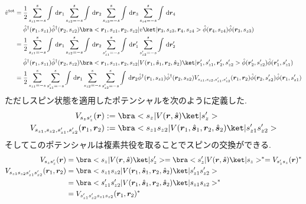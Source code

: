 \documentclass[uplatex,dvipdfmx,a4paper,11pt]{jlreq}
\newcommand{\rr}{\bm{r}}
\renewcommand{\ss}{\bm{s}}
\numberwithin{equation}{section}
\theoremstyle{definition}
\begin{document}
\begin{example}[Q21-87, Q21-88, Q21-89(i)(ii), Q21-90, Q21-91(i)(ii)(iii)(iv), Q21-92]
\begin{align}
    \hat{v}^{\mathrm{tot}} & = \frac{1}{2}\sum_{s_{z1} = -s}^s\int\dl{\rr_1}\sum_{s_{z2} = -s}^s\int\dl{\rr_2}\sum_{s_{z3} = -s}^s\int\dl{\rr_3}\sum_{s_{z4} = -s}^s\int\dl{\rr_4}                                                                                                                                               \\
                           & \quad\ \hat{\phi}^\dagger(\rr_1, s_{z1})\hat{\phi}^\dagger(\rr_2, s_{z2})\bra<\rr_1,s_{z1},\rr_2,s_{z2}|v\ket|\rr_3,s_{z3},\rr_4,s_{z4}>\hat{\phi}(\rr_4, s_{z4})\hat{\phi}(\rr_3, s_{z3})                                                                                                          \\
                           & = \frac{1}{2}\sum_{s_{z1} = -s}^s\int\dl{\rr_1}\sum_{s_{z2} = -s}^s\int\dl{\rr_2}\sum_{s_{z1}' = -s}^s\int\dl{\rr_1'}\sum_{s_{z2}' = -s}^s\int\dl{\rr_2'}                                                                                                                                           \\
                           & \quad\ \hat{\phi}^\dagger(\rr_1, s_{z1})\hat{\phi}^\dagger(\rr_2, s_{z2})\bra<\rr_1,s_{z1},\rr_2,s_{z2}|V(\rr_1, \hat{\ss}_1, \rr_2, \hat{\ss}_2)\ket|\rr_1',s_{z1}',\rr_2',s_{z2}'>\hat{\phi}(\rr_2', s_{z2}')\hat{\phi}(\rr_1', s_{z1}')                                                          \\
                           & = \frac{1}{2}\sum_{s_{z1} = -s}^s\sum_{s_{z1}' = -s}^s\int\dl{\rr_1}\sum_{s_{z2} = -s}^s\sum_{s_{z2}' = -s}^s\int\dl{\rr_2}\hat{\phi}^\dagger(\rr_1, s_{z1})\hat{\phi}^\dagger(\rr_2, s_{z2})V_{s_{z1}, s_{z2}, s_{z1}', s_{z2}'}(\rr_1, \rr_2)\hat{\phi}(\rr_2, s_{z2}')\hat{\phi}(\rr_1, s_{z1}')
  \end{align}
  ただしスピン状態を適用したポテンシャルを次のように定義した.
  \begin{align}
    V_{s_zs_z'}(\rr)                                   & := \bra<s_z|V(\rr, \hat{\ss})\ket|s_z'>                                            \\
    V_{s_{z1}, s_{z2}, s_{z1}', s_{z2}'}(\rr_1, \rr_2) & := \bra<s_{z1}s_{z2}|V(\rr_1, \hat{\ss}_1, \rr_2, \hat{\ss}_2)\ket|s_{z1}'s_{z2}'>
  \end{align}
  そしてこのポテンシャルは複素共役を取ることでスピンの交換ができる.
  \begin{align}
    V_{s_zs_z'}(\rr)                             & = \bra<s_z|V(\rr, \hat{\ss})\ket|s_z'> = \bra<s_z'|V(\rr, \hat{\ss})\ket|s_z>^* = V_{s_z's_z}(\rr)^* \\
    V_{s_{z1}s_{z2}s_{z1}'s_{z2}'}(\rr_1, \rr_2) & = \bra<s_{z1}s_{z2}|V(\rr_1, \hat{\ss}_1, \rr_2, \hat{\ss}_2)\ket|s_{z1}'s_{z2}'>                    \\
                                                 & = \bra<s_{z1}'s_{z2}'|V(\rr_1, \hat{\ss}_1, \rr_2, \hat{\ss}_2)\ket|s_{z1}s_{z2}>^*                  \\
                                                 & = V_{s_{z1}'s_{z2}'s_{z1}s_{z2}}(\rr_1, \rr_2)^*
  \end{align}
\end{example}
\end{document}
